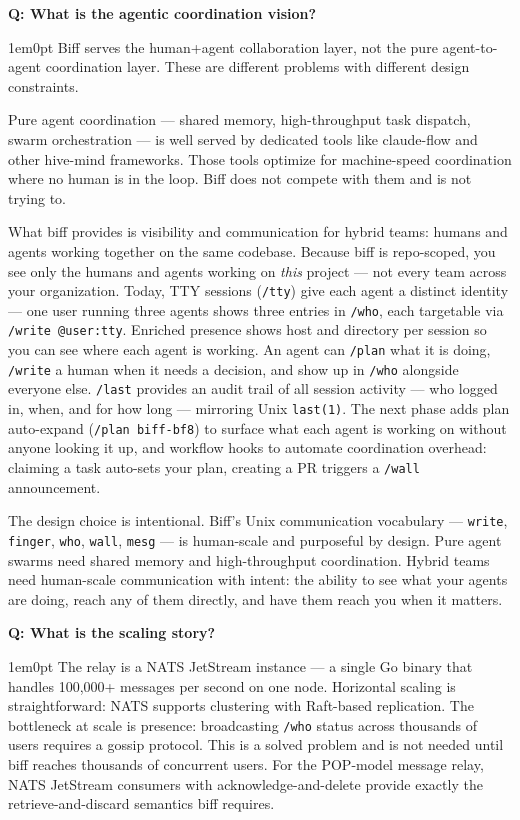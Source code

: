 \documentclass[11pt,letterpaper]{article}
\newcounter{faqnum}
\newenvironment{faqpair}[1]{%
  \needspace{4\baselineskip}%
  \vspace{0.5em}%
  \refstepcounter{faqnum}%
  \noindent\textbf{\color{SectionBlue}Q\thefaqnum: #1}\par\nopagebreak[4]%
  \vspace{0.2em}%
  \begin{adjustwidth}{1em}{0pt}%
  \setlength{\parindent}{0pt}%
}{%
  \end{adjustwidth}%
  \vspace{0.5em}%
}
\begin{document}
\begin{faqpair}{What is the agentic coordination vision?}\label{faq:agentic}
  Biff serves the human+agent collaboration layer, not the pure
  agent-to-agent coordination layer. These are different problems with
  different design constraints.

  Pure agent coordination --- shared memory, high-throughput task dispatch,
  swarm orchestration --- is well served by dedicated tools like claude-flow
  and other hive-mind frameworks. Those tools optimize for machine-speed
  coordination where no human is in the loop. Biff does not compete with
  them and is not trying to.

  What biff provides is visibility and communication for hybrid teams:
  humans and agents working together on the same codebase. Because biff is
  repo-scoped, you see only the humans and agents working on \emph{this}
  project --- not every team across your organization. Today, TTY
  sessions (\texttt{/tty}) give each agent a distinct identity --- one user
  running three agents shows three entries in \texttt{/who}, each targetable
  via \texttt{/write @user:tty}. Enriched presence shows host and directory
  per session so you can see where each agent is working. An agent can
  \texttt{/plan} what it is doing, \texttt{/write} a human when it needs a
  decision, and show up in \texttt{/who} alongside everyone else.
  \texttt{/last} provides an audit trail of all session activity --- who
  logged in, when, and for how long --- mirroring Unix \texttt{last(1)}. The next
  phase adds plan auto-expand (\texttt{/plan biff-bf8}) to surface what
  each agent is working on without anyone looking it up, and workflow hooks
  to automate coordination overhead: claiming a task auto-sets your plan,
  creating a PR triggers a \texttt{/wall} announcement.

  The design choice is intentional. Biff's Unix communication vocabulary
  --- \texttt{write}, \texttt{finger}, \texttt{who}, \texttt{wall},
  \texttt{mesg} --- is human-scale and purposeful by design. Pure agent
  swarms need shared memory and high-throughput coordination. Hybrid teams
  need human-scale communication with intent: the ability to see what your
  agents are doing, reach any of them directly, and have them reach you
  when it matters.
\end{faqpair}

\begin{faqpair}{What is the scaling story?}\label{faq:scaling}
  The relay is a NATS JetStream instance --- a single Go binary that
  handles 100,000+ messages per second on one node. Horizontal scaling
  is straightforward: NATS supports clustering with Raft-based
  replication. The bottleneck at scale is presence: broadcasting
  \texttt{/who} status across thousands of users requires a gossip
  protocol. This is a solved problem and is not needed until biff reaches
  thousands of concurrent users. For the POP-model message relay, NATS
  JetStream consumers with acknowledge-and-delete provide exactly the
  retrieve-and-discard semantics biff requires.
\end{faqpair}
\end{document}
